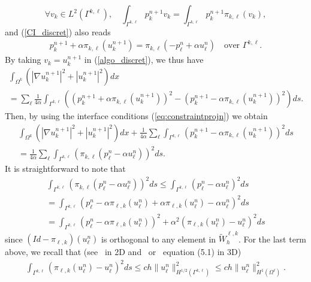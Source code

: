 \documentclass[final]{siamltex}
\begin{document}
$$\forall v_k \in L^2(\Gamma^{k,\ell}), \quad
\int_{\Gamma^{k,\ell}} p_k^{n+1} v_k = \int_{\Gamma^{k,\ell}} p_k^{n+1}
\pi_{k,\ell}(v_k),$$
and (\ref{CI_discret}) also reads
\begin{eqnarray}\label{eq:constraintprojn}
p_k^{n+1}+\alpha \pi_{k,\ell} (u_k^{n+1})=
\pi_{k,\ell} (-p_{\ell}^n+\alpha u_{\ell}^n) \quad \mbox{over }
\Gamma^{k,\ell}. 
\end{eqnarray}
By taking $v_k=u_k^{n+1}$ in (\ref{algo_discret}), we thus have
\begin{eqnarray}
\int_{\Omega^k} \left( |\nabla u_k^{n+1}|^2
+|u_k^{n+1}|^2 \right) dx
\hspace{7cm}\nonumber\\
=  \sum_{\ell} \frac{1}{4\alpha} \int_{\Gamma^{k,\ell}}\left(
( p_k^{n+1}+\alpha \pi_{k,\ell} (u_k^{n+1}))^2 - ( p_k^{n+1}-\alpha
\pi_{k,\ell} (u_k^{n+1}))^2\right)ds.
  \nonumber
\end{eqnarray}
Then, by using the interface conditions (\ref{eq:constraintprojn}) we obtain
\begin{eqnarray}
\int_{\Omega^k} \left( |\nabla u_k^{n+1}|^2
+|u_k^{n+1}|^2 \right) dx
+\frac{1}{4\alpha}\sum_{\ell}\int_{\Gamma^{k,\ell}}
( p_k^{n+1}-\alpha \pi_{k,\ell}(u_k^{n+1}))^2ds\nonumber\\
= \frac{1}{4\alpha}\sum_{\ell}\int_{\Gamma^{k,\ell}}
  (\pi_{k,\ell}(p_{\ell}^{n}-\alpha u_{\ell}^{n}))^2 ds. \nonumber
\end{eqnarray}
It is straightforward to note that
\begin{eqnarray}
\int_{\Gamma^{k,\ell}}
(\pi_{k,\ell}(p_{\ell}^{n}-\alpha u_{\ell}^{n}))^2ds
\le \int_{\Gamma^{k,\ell}}
( p_{\ell}^{n}-\alpha  u_{\ell}^{n})^2 ds\nonumber\\
=  \int_{\Gamma^{k,\ell}}(p_{\ell}^{n} -\alpha \pi_{\ell,k}(u_{\ell}^{n}) +
\alpha \pi_{\ell,k}(u_{\ell}^{n}) -
\alpha  u_{\ell}^{n})^2ds\nonumber\\
= \int_{\Gamma^{k,\ell}}(p_{\ell}^{n} -\alpha \pi_{\ell,k}(u_{\ell}^{n}))^2 +
\alpha ^2(\pi_{\ell,k}(u_{\ell}^{n}) - u_{\ell}^{n})^2ds \nonumber
\end{eqnarray}
since $(Id-\pi_{\ell,k})(u_{\ell}^{n})$ is orthogonal to any element in
$\tilde W_h^{\ell,k}$. For the last term above, we recall that (see~\cite{BMP} in 2D
and~\cite{BBM} or~\cite{BraessDahmen} equation (5.1) in 3D)
\begin{eqnarray*}
\label{eq:propr-pilk}
\int_{\Gamma^{k,\ell}}(\pi_{\ell,k}(u_{\ell}^{n}) - u_{\ell}^{n})^2ds
\le c h \|u_\ell^n\|_{H^{1/2}(\Gamma^{k,\ell})}^2
\le c h \| u_\ell^n\|_{H^1(\Omega^{\ell})}^2.
\end{eqnarray*}
\end{document}

